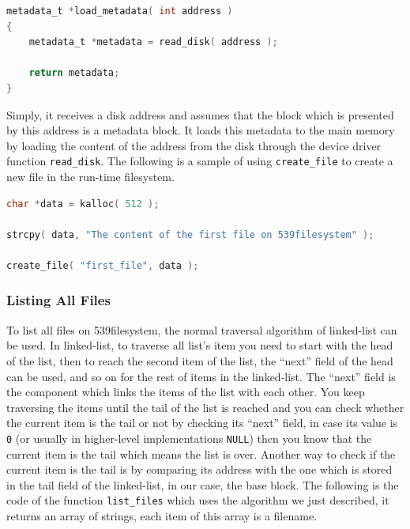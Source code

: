 \begin{lstlisting}[language=C]
metadata_t *load_metadata( int address )
{
    metadata_t *metadata = read_disk( address );
    
    return metadata;
}
\end{lstlisting}

Simply, it receives a disk address and assumes that the block which is
presented by this address is a metadata block. It loads this metadata to
the main memory by loading the content of the address from the disk
through the device driver function \lstinline!read_disk!. The following
is a sample of using \lstinline!create_file! to create a new file in the
run-time filesystem.

\begin{lstlisting}[language=C]
char *data = kalloc( 512 );

strcpy( data, "The content of the first file on 539filesystem" );
    
create_file( "first_file", data );
\end{lstlisting}

\subsubsection{Listing All Files}\label{listing-all-files}

To list all files on 539filesystem, the normal traversal algorithm of
linked-list can be used. In linked-list, to traverse all list's item you
need to start with the head of the list, then to reach the second item
of the list, the ``next'' field of the head can be used, and so on for
the rest of items in the linked-list. The ``next'' field is the
component which links the items of the list with each other. You keep
traversing the items until the tail of the list is reached and you can
check whether the current item is the tail or not by checking its
``next'' field, in case its value is \lstinline!0! (or usually in
higher-level implementations \lstinline!NULL!) then you know that the
current item is the tail which means the list is over. Another way to
check if the current item is the tail is by comparing its address with
the one which is stored in the tail field of the linked-list, in our
case, the base block. The following is the code of the function
\lstinline!list_files! which uses the algorithm we just described, it
returns an array of strings, each item of this array is a filename.

